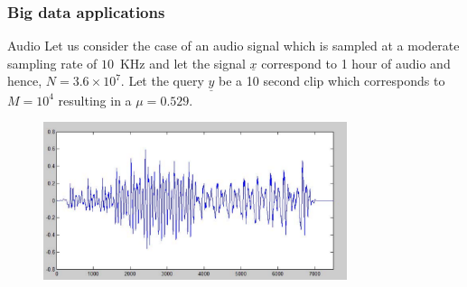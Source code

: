 \documentclass[10pt,xcolor=table]{beamer}
\newcommand{\xv}{\underline{x}}
\newcommand{\yv}{\underline{y}}
\begin{document}
\begin{frame}\frametitle{Big data applications}
\begin{block}{Audio}
Let us consider the case of an audio signal which is sampled at a moderate sampling rate of $10$~KHz and let the signal $\xv$ correspond to 1 hour of audio and hence, $N = 3.6 \times 10^7$. Let the query $\yv$ be a 10 second clip which corresponds to $M = 10^4$ resulting in a $\mu = 0.529$.
\end{block}
\begin{block}{}
\begin{figure}
\includegraphics[width=3.5in]{ScaledVoice.pdf}
\end{figure}
\end{block}
\end{frame}
%		
\end{document}
